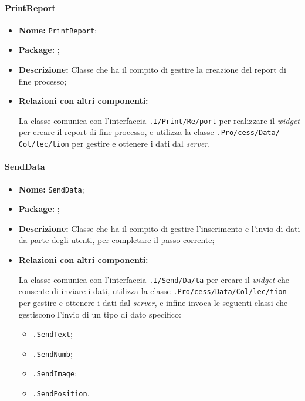 \paragraph{PrintReport}
\begin{flushleft}
\begin{itemize}
\item \textbf{Nome:} \texttt{PrintReport};
\item \textbf{Package:} \texttt{\logicUser};
\item \textbf{Descrizione:} Classe che ha il compito di gestire la creazione del report di fine processo;
\item \textbf{Relazioni con altri componenti:}
\begin{sloppypar}
La classe comunica con l'interfaccia \texttt{\viewUser{}.I\fshyp{}Print\fshyp{}Re\fshyp{}port} per realizzare il \textit{widget} per creare il report di fine processo, e utilizza la classe \texttt{\collection{}.Pro\fshyp{}cess\fshyp{}Data\fshyp{}Col\fshyp{}lec\fshyp{}tion} per gestire e ottenere i dati dal \textit{server}.
\end{sloppypar}
\end{itemize}
\end{flushleft}

\paragraph{SendData}
\begin{flushleft}
\begin{itemize}
\item \textbf{Nome:} \texttt{SendData};
\item \textbf{Package:} \texttt{\logicUser};
\item \textbf{Descrizione:} Classe che ha il compito di gestire l'inserimento e l'invio di dati da parte degli utenti, per completare il passo corrente;
\item \textbf{Relazioni con altri componenti:}
\begin{sloppypar}
La classe comunica con l'interfaccia \texttt{\viewUser{}.I\fshyp{}Send\fshyp{}Da\fshyp{}ta} per creare il \textit{widget} che consente di inviare i dati, utilizza la classe \texttt{\collection{}.Pro\fshyp{}cess\fshyp{}Data\fshyp{}Col\fshyp{}lec\fshyp{}tion} per gestire e ottenere i dati dal \textit{server}, e infine invoca le seguenti classi che gestiscono l'invio di un tipo di dato specifico:
\begin{itemize}
	\item \texttt{\logicUser{}.SendText};
	\item \texttt{\logicUser{}.SendNumb};
	\item \texttt{\logicUser{}.SendImage};
	\item \texttt{\logicUser{}.SendPosition}.
\end{itemize}
\end{sloppypar}
\end{itemize}
\end{flushleft}

